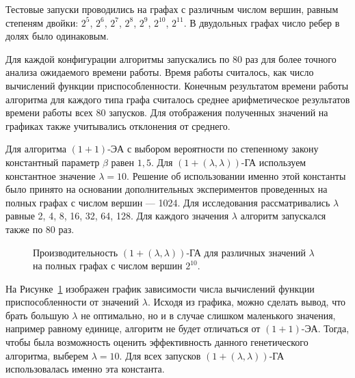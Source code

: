 \documentclass[times]{itmo-student-thesis}
\newcommand{\alglambdaf}{${(1 + (\lambda , \lambda))}$-ГА\xspace}
\newcommand{\oea}{\mbox{$(1 + 1)$-ЭА}\xspace}
\newcommand{\ollga}{${(1 + (\lambda , \lambda))}$-ГА\xspace}
\begin{document}
Тестовые запуски проводились на графах с различным числом вершин, равным степеням двойки: $2^5$, $2^6$, $2^7$, $2^8$, $2^9$, $2^{10}$, $2^{11}$.
В двудольных графах число ребер в долях было одинаковым.

Для каждой конфигурации алгоритмы запускались по 80 раз для более точного анализа ожидаемого времени работы. Время работы считалось, как число вычислений функции приспособленности. Конечным результатом времени работы алгоритма для каждого типа графа считалось среднее арифметическое результатов времени работы всех 80 запусков. Для отображения полученных значений на графиках также учитывались отклонения от среднего.

Для алгоритма \oea с выбором вероятности по степенному закону константный параметр $\beta$ равен $1,5$. Для \alglambdaf используем константное значение $\lambda = 10$.
Решение об использовании именно этой константы было принято на основании дополнительных экспериментов проведенных на полных графах с числом вершин --- 1024. Для исследования рассматривались $\lambda$ равные 2, 4, 8, 16, 32, 64, 128. Для каждого значения $\lambda$ алгоритм запускался также по 80 раз.

\begin{figure}[t!]
\caption{Производительность \ollga для различных значений $\lambda$ на полных графах с числом вершин $2^{10}$.}
\label{fig:lambda}
\end{figure}

На Рисунке~\ref{fig:lambda} изображен график зависимости числа вычислений функции приспособленности от значений $\lambda$. Исходя из графика, можно сделать вывод, что брать большую $\lambda$ не оптимально, но и в случае слишком маленького значения, например равному единице, алгоритм не будет отличаться от \oea. Тогда, чтобы была возможность оценить эффективность данного генетического алгоритма, выберем $\lambda = 10$. Для всех запусков \alglambdaf использовалась именно эта константа.
\end{document}
